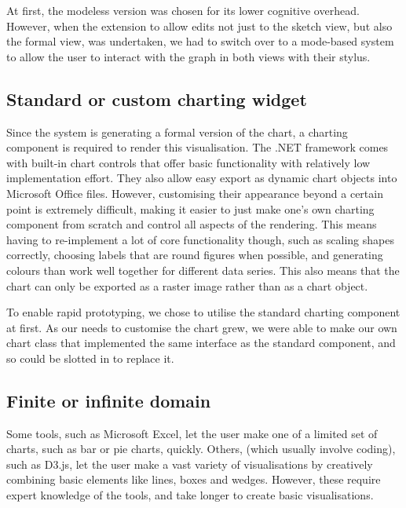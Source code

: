 	At first, the modeless version was chosen for its lower cognitive overhead. However, when the extension to allow edits not just to the sketch view, but also the formal view, was undertaken, we had to switch over to a mode-based system to allow the user to interact with the graph in both views with their stylus.
	
	\subsection{Standard or custom charting widget}	
	Since the system is generating a formal version of the chart, a charting component is required to render this visualisation. The .NET framework comes with built-in chart controls that offer basic functionality with relatively low implementation effort. They also allow easy export as dynamic chart objects into Microsoft Office files. However, customising their appearance beyond a certain point is extremely difficult, making it easier to just make one's own charting component from scratch and control all aspects of the rendering. This means having to re-implement a lot of core functionality though, such as scaling shapes correctly, choosing labels that are round figures when possible, and generating colours than work well together for different data series. This also means that the chart can only be exported as a raster image rather than as a chart object.
	
	To enable rapid prototyping, we chose to utilise the standard charting component at first. As our needs to customise the chart grew, we were able to make our own chart class that implemented the same interface as the standard component, and so could be slotted in to replace it.
	
	\subsection{Finite or infinite domain}
	Some tools, such as Microsoft Excel, let the user make one of a limited set of charts, such as bar or pie charts, quickly. Others, (which usually involve coding), such as D3.js, let the user make a vast variety of visualisations by creatively combining basic elements like lines, boxes and wedges. However, these require expert knowledge of the tools, and take longer to create basic visualisations. 
	

